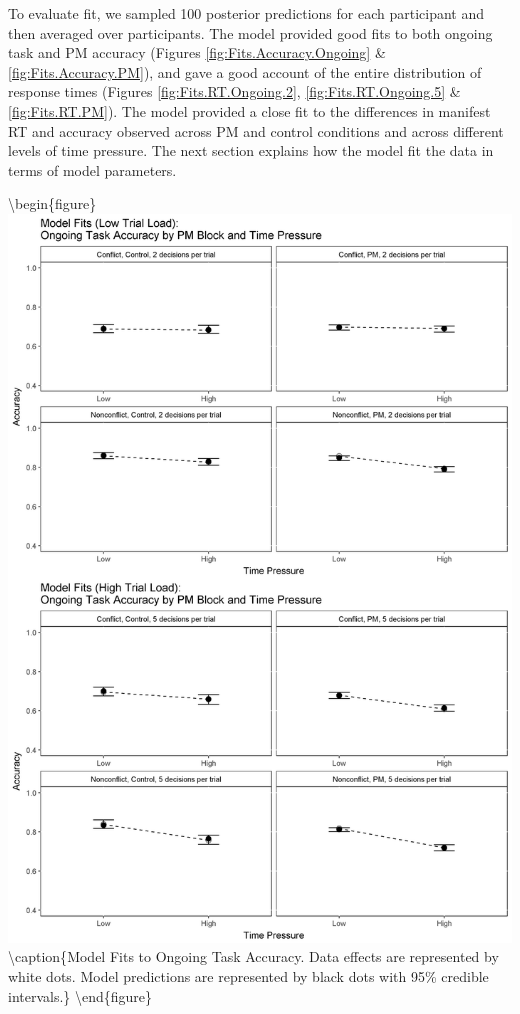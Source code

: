 \documentclass[11pt,]{article}
\begin{document}
To evaluate fit, we sampled 100 posterior predictions for each
participant and then averaged over participants. The model provided good
fits to both ongoing task and PM accuracy (Figures
\ref{fig:Fits.Accuracy.Ongoing} \& \ref{fig:Fits.Accuracy.PM}), and gave
a good account of the entire distribution of response times (Figures
\ref{fig:Fits.RT.Ongoing.2}, \ref{fig:Fits.RT.Ongoing.5} \&
\ref{fig:Fits.RT.PM}). The model provided a close fit to the differences
in manifest RT and accuracy observed across PM and control conditions
and across different levels of time pressure. The next section explains
how the model fit the data in terms of model parameters.

\textbackslash{}begin\{figure\}
\includegraphics[width=0.8\linewidth]{figures/E1/E1.Fits.Accuracy.Ongoing}
\textbackslash{}caption\{\label{fig:Fits.Accuracy.Ongoing}Model Fits to
Ongoing Task Accuracy. Data effects are represented by white dots. Model
predictions are represented by black dots with 95\% credible
intervals.\}\label{fig:Fit Plot: Accuracy Ongoing}
\textbackslash{}end\{figure\}
\end{document}
